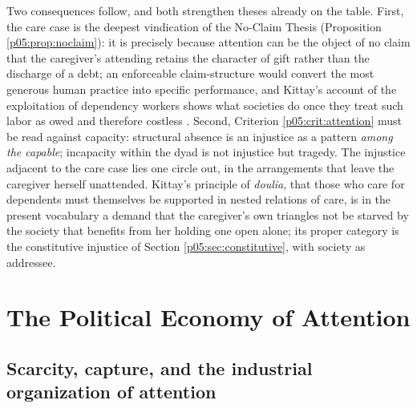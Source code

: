 Two consequences follow, and both strengthen theses already on the table. First, the care case is the deepest vindication of the No-Claim Thesis (Proposition \ref{p05:prop:noclaim}): it is precisely because attention can be the object of no claim that the caregiver's attending retains the character of gift rather than the discharge of a debt; an enforceable claim-structure would convert the most generous human practice into specific performance, and Kittay's account of the exploitation of dependency workers shows what societies do once they treat such labor as owed and therefore costless \parencite{kittay1999}. Second, Criterion \ref{p05:crit:attention} must be read against capacity: structural absence is an injustice as a pattern \emph{among the capable}; incapacity within the dyad is not injustice but tragedy. The injustice adjacent to the care case lies one circle out, in the arrangements that leave the caregiver herself unattended. Kittay's principle of \emph{doulia}, that those who care for dependents must themselves be supported in nested relations of care, is in the present vocabulary a demand that the caregiver's own triangles not be starved by the society that benefits from her holding one open alone; its proper category is the constitutive injustice of Section \ref{p05:sec:constitutive}, with society as addressee.

\section{The Political Economy of Attention}
\label{p05:sec:economy}

\subsection{Scarcity, capture, and the industrial organization of attention}

